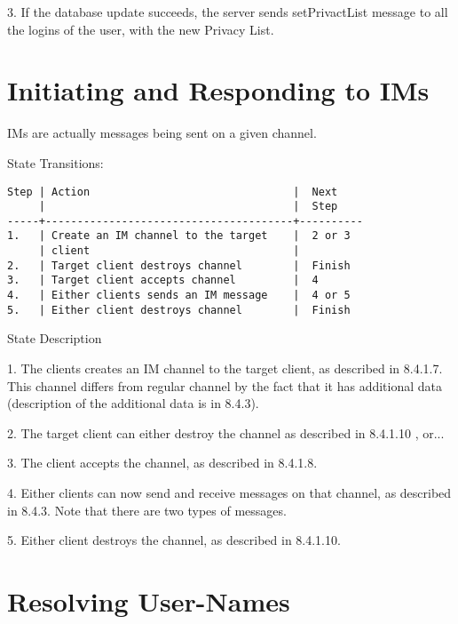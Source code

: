 \documentclass[titlepage,oneside]{book}
\begin{document}
\par{} 3. If the database update succeeds, the server sends
setPrivactList message to all the logins of the user, with the new
Privacy List.

\section{Initiating and Responding to IMs}

\par{} IMs are actually messages being sent on a given channel.

\par{} State Transitions:

\begin{verbatim}
Step | Action                                |  Next
     |                                       |  Step
-----+---------------------------------------+----------
1.   | Create an IM channel to the target    |  2 or 3
     | client                                |
2.   | Target client destroys channel        |  Finish
3.   | Target client accepts channel         |  4
4.   | Either clients sends an IM message    |  4 or 5
5.   | Either client destroys channel        |  Finish
\end{verbatim}

\par{} State Description

\par{} 1. The clients creates an IM channel to the target client, as
described in 8.4.1.7. This channel differs from regular channel by the
fact that it has additional data (description of the additional data
is in 8.4.3).

\par{} 2. The target client can either destroy the channel as
described in 8.4.1.10 , or...

\par{} 3. The client accepts the channel, as described in 8.4.1.8.

\par{} 4. Either clients can now send and receive messages on that
channel, as described in 8.4.3. Note that there are two types of
messages.

\par{} 5. Either client destroys the channel, as described in
8.4.1.10.

\section{Resolving User-Names}
\end{document}
